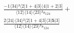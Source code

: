 \documentclass[varwidth, border=5pt]{standalone}
\begin{document}
\begin{my}
$\begin{gathered}
\scriptscriptstyle\frac{-1⟨34⟩²⟨2|1+4|3]⟨4|1+2|3]}{⟨12⟩⟨14⟩⟨23⟩²s_{124}} +\\
\scriptscriptstyle\frac{2⟨24⟩⟨34⟩²⟨2|1+4|3]⟨3|𝟓|3]}{⟨12⟩⟨14⟩⟨23⟩³s_{124}} \phantom{+}
\end{gathered}$
\end{my}
\end{document}
